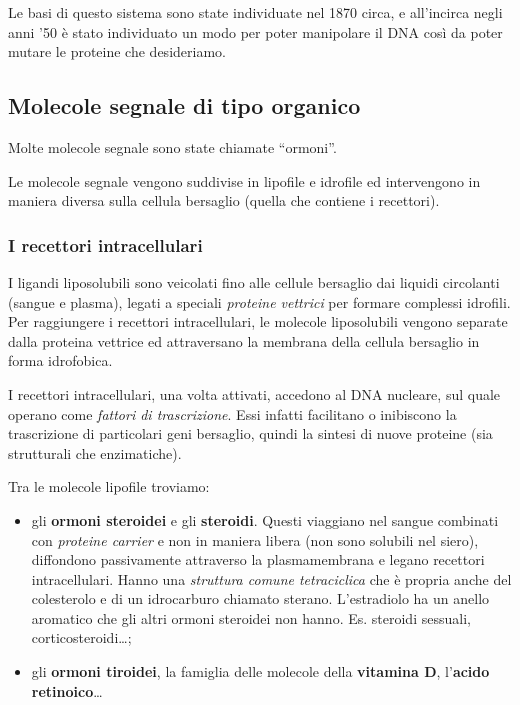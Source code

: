 \documentclass[]{article}
\begin{document}
Le basi di questo sistema sono state individuate nel 1870 circa, e
all'incirca negli anni '50 è stato individuato un modo per poter
manipolare il DNA così da poter mutare le proteine che desideriamo.

\subsection{Molecole segnale di tipo
organico}\label{molecole-segnale-di-tipo-organico}

Molte molecole segnale sono state chiamate ``ormoni''.

Le molecole segnale vengono suddivise in lipofile e idrofile ed
intervengono in maniera diversa sulla cellula bersaglio (quella che
contiene i recettori).

\subsubsection{I recettori
intracellulari}\label{i-recettori-intracellulari}

I ligandi liposolubili sono veicolati fino alle cellule bersaglio dai
liquidi circolanti (sangue e plasma), legati a speciali \emph{proteine
vettrici} per formare complessi idrofili. Per raggiungere i recettori
intracellulari, le molecole liposolubili vengono separate dalla proteina
vettrice ed attraversano la membrana della cellula bersaglio in forma
idrofobica.

I recettori intracellulari, una volta attivati, accedono al DNA
nucleare, sul quale operano come \emph{fattori di trascrizione}. Essi
infatti facilitano o inibiscono la trascrizione di particolari geni
bersaglio, quindi la sintesi di nuove proteine (sia strutturali che
enzimatiche).

Tra le molecole lipofile troviamo:

\begin{itemize}
\itemsep1pt\parskip0pt
\item
  gli \textbf{ormoni steroidei} e gli \textbf{steroidi}. Questi
  viaggiano nel sangue combinati con \emph{proteine carrier} e non in
  maniera libera (non sono solubili nel siero), diffondono passivamente
  attraverso la plasmamembrana e legano recettori intracellulari. Hanno
  una \emph{struttura comune tetraciclica} che è propria anche del
  colesterolo e di un idrocarburo chiamato sterano. L'estradiolo ha un
  anello aromatico che gli altri ormoni steroidei non hanno. Es.
  steroidi sessuali, corticosteroidi\ldots{};
\item
  gli \textbf{ormoni tiroidei}, la famiglia delle molecole della
  \textbf{vitamina D}, l'\textbf{acido retinoico}\ldots{}
\end{itemize}
\end{document}
